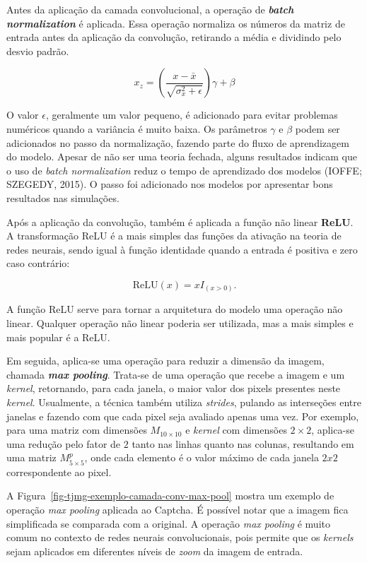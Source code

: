 \documentclass[12pt,twoside,brazilian]{book}
\begin{document}
Antes da aplicação da camada convolucional, a operação de
\textbf{\emph{batch normalization}} é aplicada. Essa operação normaliza
os números da matriz de entrada antes da aplicação da convolução,
retirando a média e dividindo pelo desvio padrão.

\[
x_z = \left(\frac{x-\bar x}{\sqrt{\sigma^2_x + \epsilon}}\right) \gamma + \beta
\]

O valor \(\epsilon\), geralmente um valor pequeno, é adicionado para
evitar problemas numéricos quando a variância é muito baixa. Os
parâmetros \(\gamma\) e \(\beta\) podem ser adicionados no passo da
normalização, fazendo parte do fluxo de aprendizagem do modelo. Apesar
de não ser uma teoria fechada, alguns resultados indicam que o uso de
\emph{batch normalization} reduz o tempo de aprendizado dos modelos
(IOFFE; SZEGEDY, 2015). O passo foi adicionado nos modelos por
apresentar bons resultados nas simulações.

Após a aplicação da convolução, também é aplicada a função não linear
\textbf{ReLU}. A transformação ReLU é a mais simples das funções da
ativação na teoria de redes neurais, sendo igual à função identidade
quando a entrada é positiva e zero caso contrário:

\[
\text{ReLU}(x) = xI_{(x>0)}.
\]

A função ReLU serve para tornar a arquitetura do modelo uma operação não
linear. Qualquer operação não linear poderia ser utilizada, mas a mais
simples e mais popular é a ReLU.

Em seguida, aplica-se uma operação para reduzir a dimensão da imagem,
chamada \textbf{\emph{max pooling}}. Trata-se de uma operação que recebe
a imagem e um \emph{kernel}, retornando, para cada janela, o maior valor
dos pixels presentes neste \emph{kernel}. Usualmente, a técnica também
utiliza \emph{strides}, pulando as interseções entre janelas e fazendo
com que cada pixel seja avaliado apenas uma vez. Por exemplo, para uma
matriz com dimensões \(M_{10\times10}\) e \emph{kernel} com dimensões
\(2\times2\), aplica-se uma redução pelo fator de \(2\) tanto nas linhas
quanto nas colunas, resultando em uma matriz \(M^p_{5\times5}\), onde
cada elemento é o valor máximo de cada janela \(2x2\) correspondente ao
pixel.

A Figura~\ref{fig-tjmg-exemplo-camada-conv-max-pool} mostra um exemplo
de operação \emph{max pooling} aplicada ao Captcha. É possível notar que
a imagem fica simplificada se comparada com a original. A operação
\emph{max pooling} é muito comum no contexto de redes neurais
convolucionais, pois permite que os \emph{kernels} sejam aplicados em
diferentes níveis de \emph{zoom} da imagem de entrada.
\end{document}
